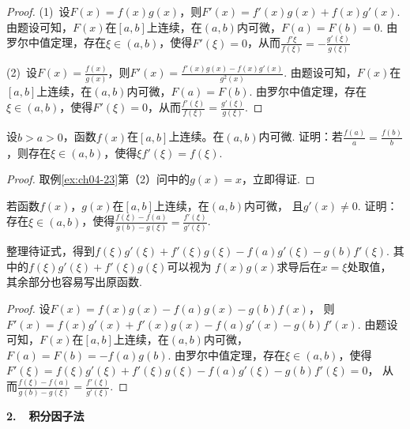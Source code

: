 \begin{proof}
(1)~设$F(x)=f(x)g(x)$，则$F'(x) = f'(x)g(x) + f(x)g'(x)$.
由题设可知，$F(x)$在$[a,b]$上连续，在$(a,b)$内可微，$F(a) = F(b) = 0$.
由罗尔中值定理，存在$\xi \in (a,b)$，使得$F'(\xi) = 0$，从而$\frac{f'{\xi}}{f(\xi)}=-\frac{g'(\xi)}{g(\xi)}$

(2)~设$F(x)=\frac{f(x)}{g(x)}$，则$F'(x) = \frac{f'(x)g(x) - f(x)g'(x)}{g^2(x)}$.
由题设可知，$F(x)$在$[a,b]$上连续，在$(a,b)$内可微，$F(a) = F(b)$.
由罗尔中值定理，存在$\xi \in (a,b)$，使得$F'(\xi) = 0$，从而$\frac{f'(\xi)}{f(\xi)}=\frac{g'(\xi)}{g(\xi)}$.
\end{proof}


\begin{example}
\label{ex:ch04-24}
设$b>a>0$，函数$f(x)$在$[a,b]$上连续。在$(a,b)$内可微.
证明：若$\frac{f(a)}{a}=\frac{f(b)}{b}$，则存在$\xi \in (a,b)$，使得$\xi f'(\xi) = f(\xi)$.
\end{example}

\begin{proof}
取例\ref{ex:ch04-23}第（2）问中的$g(x) = x$，立即得证.
\end{proof}


\begin{example}
\label{ex:ch04-25}
若函数$f(x)$，$g(x)$在$[a,b]$上连续，在$(a,b)$内可微，
且$g'(x) \ne 0$.
证明：存在$\xi \in (a,b)$，使得$\frac{f(\xi) - f(a)}{g(b) - g(\xi)} = \frac{f'(\xi)}{g'(\xi)}$.
\end{example}

\begin{analysis}
整理待证式，得到$f(\xi)g'(\xi)+f'(\xi)g(\xi) - f(a)g'(\xi) - g(b)f'(\xi) $.
其中的$f(\xi)g'(\xi)+f'(\xi)g(\xi) $可以视为
$f(x)g(x)$求导后在$x = \xi$处取值，
其余部分也容易写出原函数.
\end{analysis}

\begin{proof}
设$F(x) = f(x)g(x) - f(a)g(x) - g(b)f(x)$，
则$F'(x) = f(x)g'(x)+f'(x)g(x) - f(a)g'(x) - g(b)f'(x) $.
由题设可知，$F(x)$在$[a,b]$上连续，在$(a,b)$内可微，$F(a) = F(b) = -f(a)g(b)$.
由罗尔中值定理，存在$\xi \in (a,b)$，使得$F'(\xi) = f(\xi)g'(\xi)+f'(\xi)g(\xi) - f(a)g'(\xi) - g(b)f'(\xi) = 0$，
从而$\frac{f(\xi) - f(a)}{g(b) - g(\xi)} = \frac{f'(\xi)}{g'(\xi)}$.
\end{proof}


\textbf{2.~~积分因子法} \vspace{0.5em}

